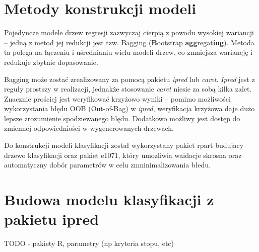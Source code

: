 \documentclass[a4paper,11pt,twoside]{mwrep}  %
\begin{document}
\section{Metody konstrukcji modeli}
Pojedyncze modele drzew regresji zazwyczaj cierpią z powodu wysokiej wariancji -- jedną z metod jej redukcji jest tzw. Bagging (\textbf{B}ootstrap \textbf{agg}regat\textbf{ing}). 
Metoda ta polega na łączeniu i uśrednianiu wielu modeli drzew, co  zmniejsza wariancję i redukuje zbytnie dopasowanie.

Bagging może zostać zrealizowany za pomocą pakietu
\textit{ipred} 
lub
\textit{caret}. 
\textit{Ipred} jest z reguły prostszy w realizacji, jednakże stosowanie \textit{caret} niesie za sobą kilka zalet.
Znacznie prościej jest weryfikować krzyżowo wyniki -- pomimo możliwości wykorzystania błędu OOB (Out-of-Bag) w \textit{ipred}, weryfikacja krzyżowa daje dużo lepsze zrozumienie spodziewanego błędu. 
Dodatkowo możliwy jest dostęp do zmiennej odpowiedniości w wygenerowanych drzewach.

Do konstrukcji modeli klasyfikacji został wykorzystany pakiet rpart budujacy drzewo klasyfikacji oraz pakiet
e1071, który umozliwia waidacje skrosna oraz automatyczny dobór parametrów w celu zmninimalizowania
błedu.

\section{Budowa modelu klasyfikacji z pakietu ipred}
TODO - pakiety R, parametry (np kryteria stopu, etc)
\end{document}
